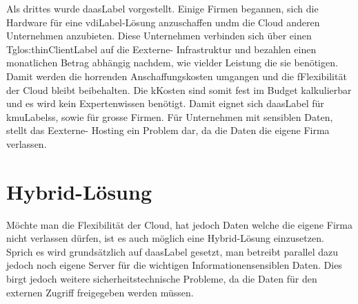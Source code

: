 Als drittes wurde \Gls{daasLabel} vorgestellt. Einige Firmen begannen, sich die Hardware für eine \Gls{vdiLabel}-Lösung anzuschaffen undm die Cloud anderen Unternehmen anzubieten. Diese Unternehmen verbinden sich über einen T\Gls{glos:thinClientLabel} auf die Eexterne- Infrastruktur und bezahlen einen monatlichen Betrag abhängig nachdem, wie vielder Leistung die sie benötigen. Damit werden die horrenden Anschaffungskosten umgangen und die fFlexibilität der Cloud bleibt beibehalten. Die kKosten sind somit fest im Budget kalkulierbar und es wird kein Expertenwissen benötigt. Damit eignet sich \Gls{daasLabel} für \Glspl{kmuLabel}s, sowie für grosse Firmen. Für Unternehmen mit sensiblen Daten, stellt das Eexterne- Hosting ein Problem dar, da die Daten die eigene Firma verlassen.

\section{Hybrid-Lösung}
Möchte man die Flexibilität der Cloud, hat jedoch Daten welche die eigene Firma nicht verlassen dürfen, ist es auch möglich eine Hybrid-Lösung einzusetzen. Sprich es wird grundsätzlich auf \Gls{daasLabel} gesetzt, man betreibt parallel dazu jedoch noch eigene Server für die wichtigen Informationensensiblen Daten. Dies birgt jedoch weitere sicherheitstechnische Probleme, da die Daten für den externen Zugriff freigegeben werden müssen.



\glsaddall
